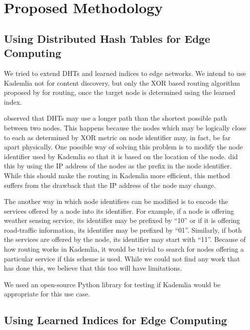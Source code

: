 \chapter{Proposed Methodology}

\section{Using Distributed Hash Tables for Edge Computing}

We tried to extend DHTs and learned indices to edge networks. We intend to use
Kademlia not for content discovery, but only the XOR based routing algorithm
proposed by \citet{petarmaymounkovKademliaPeertoPeerInformation2002} for
routing, once the target node is determined using the learned index.

\citet{xieEfficientIndexingMechanism2019} observed that DHTs may use a longer
path than the shortest possible path between two nodes. This happens because the
nodes which may be logically close to each as determined by XOR metric on node
identifier may, in fact, be far apart physically. One possible way of solving
this problem is to modify the node identifier used by Kademlia so that it is
based on the location of the node. \citet{mengweiImprovementKademliaBased2013}
did this by using the IP address of the nodes as the prefix in the node
identifier. While this should make the routing in Kademlia more efficient, this
method suffers from the drawback that the IP address of the node may change.

The another way in which node identifiers can be modified is to encode the
services offered by a node into its identifier. For example, if a node is offering
weather sensing service, its identifier may be prefixed by ``10'' or if it is
offering road-traffic information, its identifier may be prefixed by ``01''.
Similarly, if both the services are offered by the node, its identifier may
start with ``11''. Because of how routing works in Kademlia, it would be trivial
to search for nodes offering a particular service if this scheme is used. While
we could not find any work that has done this, we believe that this too will
have limitations.

We used an open-source Python library for testing if Kademlia would be
appropriate for this use case. \cite{KademliaIndexRst}

\section{Using Learned Indices for Edge Computing}


